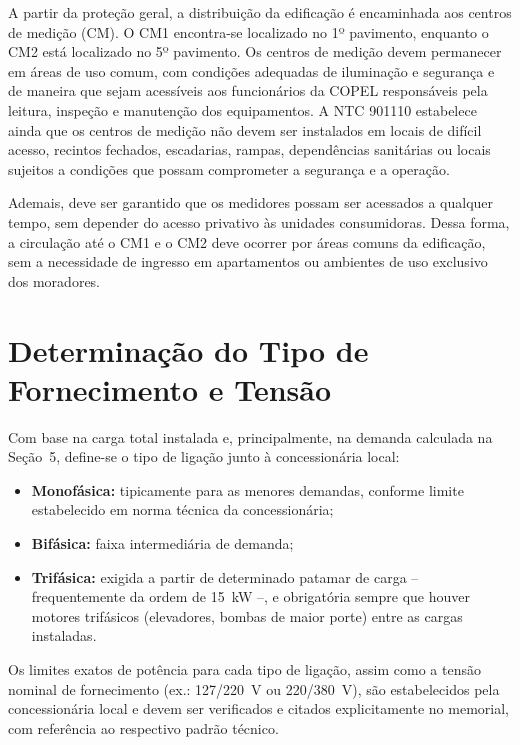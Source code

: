 \documentclass[12pt,openright,oneside,a4paper,brazil]{abntex2}
\begin{document}
A partir da proteção geral, a distribuição da edificação é encaminhada aos centros de medição (CM). O CM1 encontra-se localizado no 1º pavimento, enquanto o CM2 está localizado no 5º pavimento. Os centros de medição devem permanecer em áreas de uso comum, com condições adequadas de iluminação e segurança e de maneira que sejam acessíveis aos funcionários da COPEL responsáveis pela leitura, inspeção e manutenção dos equipamentos. A NTC 901110 estabelece ainda que os centros de medição não devem ser instalados em locais de difícil acesso, recintos fechados, escadarias, rampas, dependências sanitárias ou locais sujeitos a condições que possam comprometer a segurança e a operação.

Ademais, deve ser garantido que os medidores possam ser acessados a qualquer tempo, sem depender do acesso privativo às unidades consumidoras. Dessa forma, a circulação até o CM1 e o CM2 deve ocorrer por áreas comuns da edificação, sem a necessidade de ingresso em apartamentos ou ambientes de uso exclusivo dos moradores.

\section{Determinação do Tipo de Fornecimento e Tensão}

\hspace{1.27cm}Com base na carga total instalada e, principalmente, na demanda calculada
na Seção~5, define-se o tipo de ligação junto à concessionária local:

\begin{itemize}[leftmargin=1.2cm]
    \item \textbf{Monofásica:} tipicamente para as menores demandas,
    conforme limite estabelecido em norma técnica da concessionária;
    \item \textbf{Bifásica:} faixa intermediária de demanda;
    \item \textbf{Trifásica:} exigida a partir de determinado patamar de
    carga -- frequentemente da ordem de \SI{15}{kW} --, e obrigatória
    sempre que houver motores trifásicos (elevadores, bombas de maior
    porte) entre as cargas instaladas.
\end{itemize}

Os limites exatos de potência para cada tipo de ligação, assim como a
tensão nominal de fornecimento (ex.: 127/220~V ou 220/380~V), são
estabelecidos pela concessionária local e devem ser verificados e citados
explicitamente no memorial, com referência ao respectivo padrão técnico.
\end{document}
